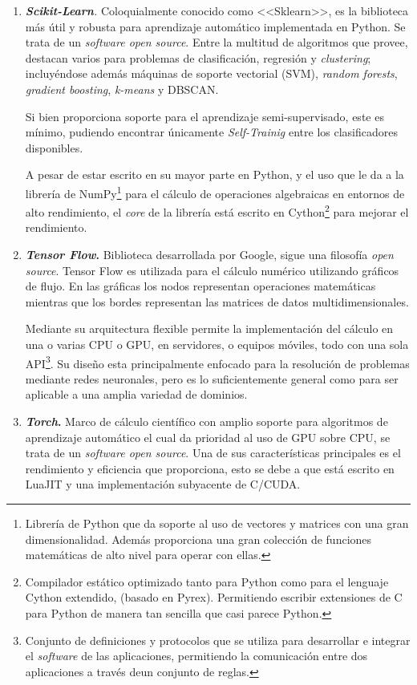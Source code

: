 \begin{enumerate}
\item \textit{\textbf{Scikit-Learn}.}
Coloquialmente conocido como <<Sklearn>>, es la biblioteca más útil y robusta para aprendizaje automático implementada en Python. Se trata de un \textit{software open source}. Entre la multitud de algoritmos que provee, destacan varios para problemas de clasificación, regresión y \textit{clustering}; incluyéndose además máquinas de soporte vectorial (SVM), \textit{random forests}, \textit{gradient boosting}, \textit{k-means} y DBSCAN.

Si bien proporciona soporte para el aprendizaje semi-supervisado, este es mínimo, pudiendo encontrar únicamente \textit{Self-Trainig} entre los clasificadores disponibles.

A pesar de estar escrito en su mayor parte en Python, y el uso que le da a la librería de NumPy\footnote{Librería de Python que da soporte al uso de vectores y matrices con una gran dimensionalidad. Además proporciona una gran colección de funciones matemáticas de alto nivel para operar con ellas.} para el cálculo de operaciones algebraicas en entornos de alto rendimiento, el \textit{core} de la librería está escrito en Cython\footnote{Compilador estático optimizado tanto para Python como para el lenguaje Cython extendido, (basado en Pyrex). Permitiendo escribir extensiones de C para Python de manera tan sencilla que casi parece Python.} para mejorar el rendimiento. 

\item \textbf{\textit{Tensor Flow}.}
Biblioteca desarrollada por Google, sigue una filosofía \textit{open source}. Tensor Flow es utilizada para el cálculo numérico utilizando gráficos de flujo. En las gráficas los nodos representan operaciones matemáticas mientras que los bordes representan las matrices de datos multidimensionales.

Mediante su arquitectura flexible permite la implementación del cálculo en una o varias CPU o GPU, en servidores, o equipos móviles, todo con una sola API\footnote{Conjunto de definiciones y protocolos que se utiliza para desarrollar e integrar el \textit{software} de  las aplicaciones, permitiendo la comunicación entre dos aplicaciones a través deun conjunto de reglas.}. Su diseño esta principalmente enfocado para la resolución de problemas mediante redes neuronales, pero es lo suficientemente general como para ser aplicable a una amplia variedad de dominios.

\item \textbf{\textit{Torch}.}
Marco de cálculo científico con amplio soporte para algoritmos de aprendizaje automático el cual da prioridad al uso de GPU sobre CPU, se trata de un \textit{software open source}. Una de sus características principales es el rendimiento y eficiencia que proporciona, esto se debe a que está escrito en LuaJIT y una implementación subyacente de C/CUDA.


\end{enumerate}
